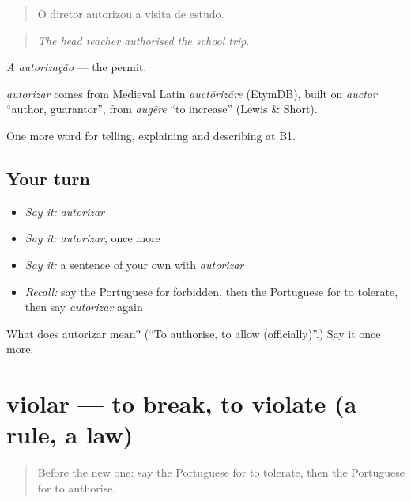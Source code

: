 \begin{quote}
O diretor autorizou a visita de estudo.
\end{quote}

\begin{quote}
\emph{The head teacher authorised the school trip.}
\end{quote}

\emph{A autorização} — the permit.

\begin{cousinweb}
\emph{autorizar} comes from Medieval Latin \emph{auctōrizāre} (EtymDB), built on \emph{auctor} \textquotedblleft{}author, guarantor\textquotedblright{}, from \emph{augēre} \textquotedblleft{}to increase\textquotedblright{} (Lewis \& Short).
\end{cousinweb}

\begin{grammarlens}[title={What you've built}]
One more word for telling, explaining and describing at B1.
\end{grammarlens}

\subsection*{Your turn}
\begin{itemize}
\raggedright
  \item \emph{Say it:} \emph{autorizar}
  \item \emph{Say it:} \emph{autorizar}, once more
  \item \emph{Say it:} a sentence of your own with \emph{autorizar}
  \item \emph{Recall:} say the Portuguese for forbidden, then the Portuguese for to tolerate, then say \emph{autorizar} again
\end{itemize}

\begin{tcolorbox}[breakable,colback=teal!4,colframe=teal!35!black,title={Before you move on}]
What does autorizar mean? (\textquotedblleft{}To authorise, to allow (officially)\textquotedblright{}.) Say it once more.
\end{tcolorbox}
\section[violar]{violar — to break, to violate (a rule, a law)}

\label{lesson:PT-C382-violar}



\begin{quote}
Before the new one: say the Portuguese for to tolerate, then the Portuguese for to authorise.
\end{quote}

